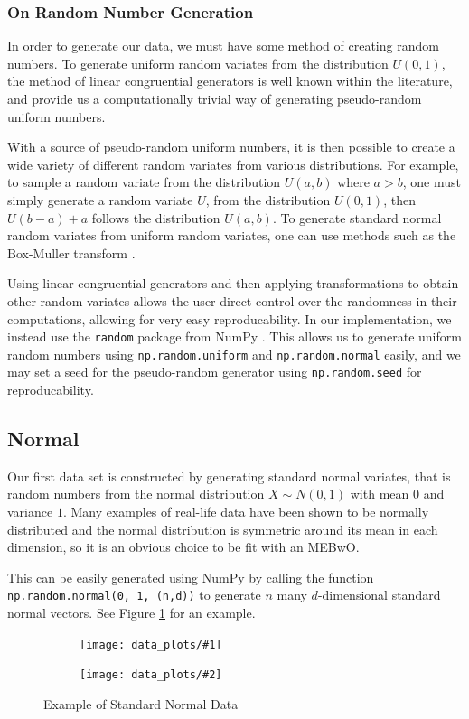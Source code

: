 \documentclass[11pt,twoside]{report}
\newcommand{\datafigure}[4]{
    \begin{figure}
    \centering
    \begin{subfigure}[b]{0.3333\textwidth}
        \centering
        \texttt{[image: data\_plots/\#1]}
    \end{subfigure}
    \begin{subfigure}[b]{0.3333\textwidth}
        \centering
        \texttt{[image: data\_plots/\#2]}
    \end{subfigure}
    \hfill
    \caption{#3}
    \label{#4}
\end{figure}
}
\theoremstyle{definition}
\numberwithin{theorem}{section}
\numberwithin{definition}{section}
\numberwithin{lemma}{section}
\numberwithin{proposition}{section}
\numberwithin{equation}{section}
\numberwithin{figure}{section}
\begin{document}
\subsubsection{On Random Number Generation}
In order to generate our data, we must have some method of creating random numbers. To generate uniform random variates from the distribution $U(0,1)$, the method of linear congruential generators \cite{lcg1,lcg2} is well known within the literature, and provide us a computationally trivial way of generating pseudo-random uniform numbers.

With a source of pseudo-random uniform numbers, it is then possible to create a wide variety of different random variates from various distributions. For example, to sample a random variate from the distribution $U(a,b)$ where $a>b$, one must simply generate a random variate $U$, from the distribution $U(0,1)$, then $U(b-a)+a$ follows the distribution $U(a,b)$. To generate standard normal random variates from uniform random variates, one can use methods such as the Box-Muller transform \cite{boxmuller}.

Using linear congruential generators and then applying transformations to obtain other random variates allows the user direct control over the randomness in their computations, allowing for very easy reproducability. In our implementation, we instead use the \texttt{random} package from NumPy \cite{numpy}. This allows us to generate uniform random numbers using \texttt{np.random.uniform} and \texttt{np.random.normal} easily, and we may set a seed for the pseudo-random generator using \texttt{np.random.seed} for reproducability.


\subsection{Normal}
Our first data set is constructed by generating standard normal variates, that is random numbers from the normal distribution $X\sim N(0,1)$ with mean $0$ and variance $1$. Many examples of real-life data have been shown to be normally distributed and the normal distribution is symmetric around its mean in each dimension, so it is an obvious choice to be fit with an MEBwO.

This can be easily generated using NumPy \cite{numpy} by calling the function \texttt{np.random.normal(0, 1, (n,d))} to generate $n$ many $d$-dimensional standard normal vectors. See Figure \ref{fig:normal} for an example.

\datafigure{normal_2d.png}{normal_3d.png}{Example of Standard Normal Data}{fig:normal}
\end{document}
